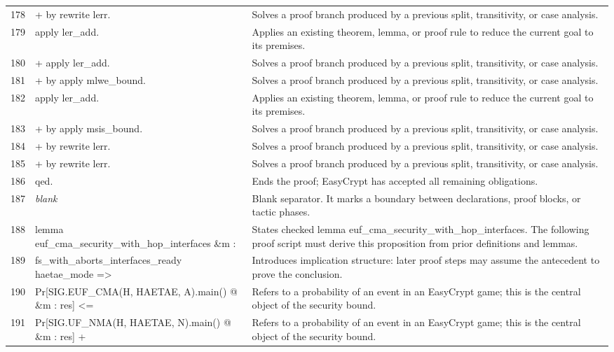 \documentclass[10pt]{article}
\begin{document}
\begin{longtable}{r L{0.53\textwidth} L{0.37\textwidth}}
178 & {\ttfamily\scriptsize   + by rewrite lerr.} & Solves a proof branch produced by a previous split, transitivity, or case analysis. \\
179 & {\ttfamily\scriptsize apply ler\_add.} & Applies an existing theorem, lemma, or proof rule to reduce the current goal to its premises. \\
180 & {\ttfamily\scriptsize + apply ler\_add.} & Solves a proof branch produced by a previous split, transitivity, or case analysis. \\
181 & {\ttfamily\scriptsize   + by apply mlwe\_bound.} & Solves a proof branch produced by a previous split, transitivity, or case analysis. \\
182 & {\ttfamily\scriptsize   apply ler\_add.} & Applies an existing theorem, lemma, or proof rule to reduce the current goal to its premises. \\
183 & {\ttfamily\scriptsize   + by apply msis\_bound.} & Solves a proof branch produced by a previous split, transitivity, or case analysis. \\
184 & {\ttfamily\scriptsize   + by rewrite lerr.} & Solves a proof branch produced by a previous split, transitivity, or case analysis. \\
185 & {\ttfamily\scriptsize + by rewrite lerr.} & Solves a proof branch produced by a previous split, transitivity, or case analysis. \\
186 & {\ttfamily\scriptsize qed.} & Ends the proof; EasyCrypt has accepted all remaining obligations. \\
187 & {\ttfamily\scriptsize \emph{blank}} & Blank separator.  It marks a boundary between declarations, proof blocks, or tactic phases. \\
188 & {\ttfamily\scriptsize lemma euf\_cma\_security\_with\_hop\_interfaces \&m :} & States checked lemma euf\_cma\_security\_with\_hop\_interfaces.  The following proof script must derive this proposition from prior definitions and lemmas. \\
189 & {\ttfamily\scriptsize   fs\_with\_aborts\_interfaces\_ready haetae\_mode =>} & Introduces implication structure: later proof steps may assume the antecedent to prove the conclusion. \\
190 & {\ttfamily\scriptsize   Pr[SIG.EUF\_CMA(H, HAETAE, A).main() @ \&m : res] <=} & Refers to a probability of an event in an EasyCrypt game; this is the central object of the security bound. \\
191 & {\ttfamily\scriptsize     Pr[SIG.UF\_NMA(H, HAETAE, N).main() @ \&m : res] +} & Refers to a probability of an event in an EasyCrypt game; this is the central object of the security bound. \\

\end{longtable}
\end{document}
